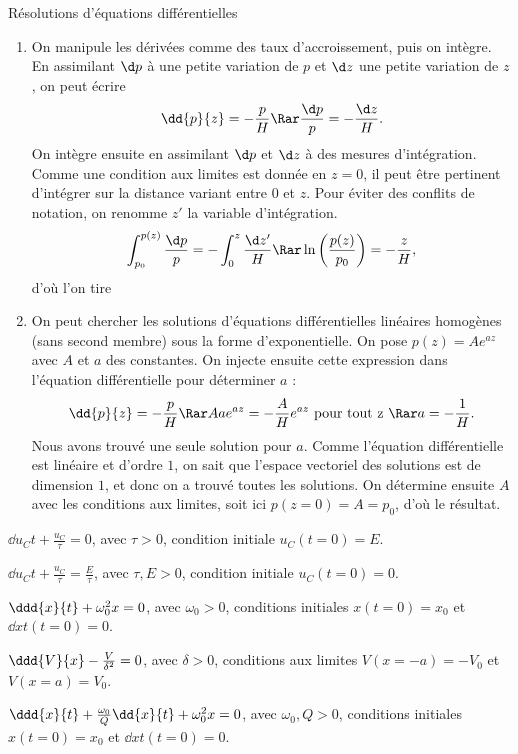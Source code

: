 \begin{exo}[PC][1][TD]{Résolutions d’équations différentielles}
\begin{quest}
{\begin{enumerate}
    \item {} On manipule les dérivées comme des taux d'accroissement, puis on intègre. En assimilant $\d p$ à une petite variation de $p$ et $\d z$ une petite variation de $z$, on peut écrire
    $$
    \dd{p}{z} = - \frac{p}{H} \Rar \frac{\d p}{p} = - \frac{\d z}{H}.
    $$
    On intègre ensuite en assimilant $\d p$ et $\d z$ à des mesures d'intégration. Comme une condition aux limites est donnée en $z=0$, il peut être pertinent d'intégrer sur la distance variant entre $0$ et $z$. Pour éviter des conflits de notation, on renomme $z'$ la variable d'intégration.
    $$
    \int_{p_0}^{p(z)} \frac{\d p}{p} = - \int_0^z \frac{\d z'}{H} \Rar \ln\left(\frac{p(z)}{p_0}\right) = - \frac{z}{H},
    $$
    d'où l'on tire
    \item {} On peut chercher les solutions d'équations différentielles linéaires homogènes (sans second membre) sous la forme d'exponentielle. On pose $p(z)=Ae^{a z}$ avec $A$ et $a$ des constantes. On injecte ensuite cette expression dans l'équation différentielle pour déterminer $a$ :
    $$
    \dd{p}{z} = - \frac{p}{H} \Rar A a e^{az} = - \frac{A}{H}e^{az} \text{ pour tout z } \Rar a = -\frac{1}{H}.
    $$
    Nous avons trouvé une seule solution pour $a$. Comme l'équation différentielle est linéaire et d'ordre $1$, on sait que l'espace vectoriel des solutions est de dimension $1$, et donc on a trouvé toutes les solutions.
    On détermine ensuite $A$ avec les conditions aux limites, soit ici $p(z=0) = A = p_0$, d'où le résultat.
  \end{enumerate}
  }
    \item $\dd{u_C}{t}+\frac{u_C}{\tau}= 0$, avec $\tau > 0 $, condition initiale $u_C(t=0)=E$.
    \item $\dd{u_C}{t}+\frac{u_C}{\tau}= \frac{E}{\tau}$,  avec $\tau,E > 0 $, condition initiale $u_C(t=0)=0$.
  \item $\ddd{x}{t}+\omega_0^2 x= 0$,  avec $\omega_0 > 0 $, conditions initiales $x(t=0)=x_0$ et $\dd{x}{t}(t=0)=0$.
  \item $\ddd{V}{x}-\frac{V}{\delta^2}= 0$,  avec $\delta > 0 $, conditions aux limites $V(x=-a)=-V_0$ et $V(x=a)=V_0$.
    \item $\ddd{x}{t}+ \frac{\omega_0}{Q} \dd{x}{t}+ \omega_0^2 x= 0$,  avec $\omega_0, Q>0 $, conditions initiales $x(t=0)=x_0$ et $\dd{x}{t}(t=0)=0$.

\end{quest}
\end{exo}
